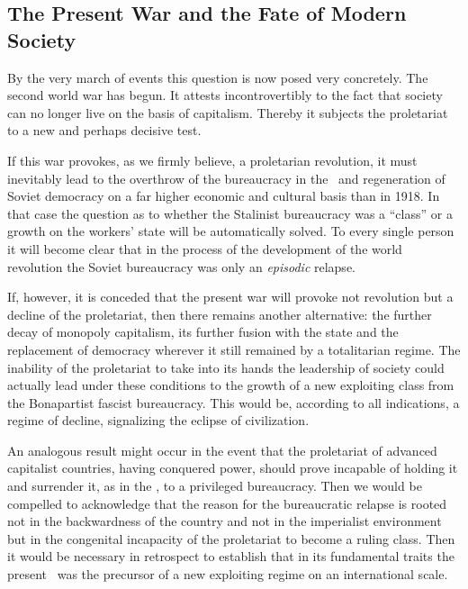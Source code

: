 \subsection*{The Present War and the Fate of Modern Society}

By the very march of events this question is now posed very concretely. The second world war has begun. It attests incontrovertibly to the fact that society can no longer live on the basis of capitalism. Thereby it subjects the proletariat to a new and perhaps decisive test.

If this war provokes, as we firmly believe, a proletarian revolution, it must inevitably lead to the overthrow of the bureaucracy in the \USSR\ and regeneration of Soviet democracy on a far higher economic and cultural basis than in 1918. In that case the question as to whether the Stalinist bureaucracy was a “class” or a growth on the workers’ state will be automatically solved. To every single person it will become clear that in the process of the development of the world revolution the Soviet bureaucracy was only an \emph{episodic} relapse.

If, however, it is conceded that the present war will provoke not revolution but a decline of the proletariat, then there remains another alternative: the further decay of monopoly capitalism, its further fusion with the state and the replacement of democracy wherever it still remained by a totalitarian regime. The inability of the proletariat to take into its hands the leadership of society could actually lead under these conditions to the growth of a new exploiting class from the Bonapartist fascist bureaucracy. This would be, according to all indications, a regime of decline, signalizing the eclipse of civilization.

An analogous result might occur in the event that the proletariat of advanced capitalist countries, having conquered power, should prove incapable of holding it and surrender it, as in the \USSR, to a privileged bureaucracy. Then we would be compelled to acknowledge that the reason for the bureaucratic relapse is rooted not in the backwardness of the country and not in the imperialist environment but in the congenital incapacity of the proletariat to become a ruling class. Then it would be necessary in retrospect to establish that in its fundamental traits the present \USSR\ was the precursor of a new exploiting regime on an international scale.

